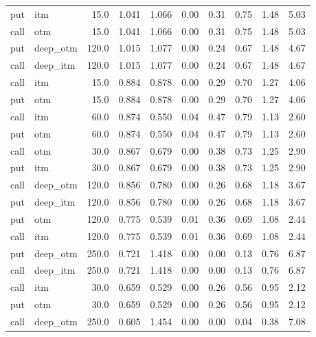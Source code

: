 \begin{longtable}{llrrrrrrrr}
  put &       itm &      15.0 & 1.041 & 1.066 &    0.00 &    0.31 &   0.75 &    1.48 &    5.03 \\
 call &       otm &      15.0 & 1.041 & 1.066 &    0.00 &    0.31 &   0.75 &    1.48 &    5.03 \\
  put &  deep\_otm &     120.0 & 1.015 & 1.077 &    0.00 &    0.24 &   0.67 &    1.48 &    4.67 \\
 call &  deep\_itm &     120.0 & 1.015 & 1.077 &    0.00 &    0.24 &   0.67 &    1.48 &    4.67 \\
 call &       itm &      15.0 & 0.884 & 0.878 &    0.00 &    0.29 &   0.70 &    1.27 &    4.06 \\
  put &       otm &      15.0 & 0.884 & 0.878 &    0.00 &    0.29 &   0.70 &    1.27 &    4.06 \\
 call &       itm &      60.0 & 0.874 & 0.550 &    0.04 &    0.47 &   0.79 &    1.13 &    2.60 \\
  put &       otm &      60.0 & 0.874 & 0.550 &    0.04 &    0.47 &   0.79 &    1.13 &    2.60 \\
 call &       otm &      30.0 & 0.867 & 0.679 &    0.00 &    0.38 &   0.73 &    1.25 &    2.90 \\
  put &       itm &      30.0 & 0.867 & 0.679 &    0.00 &    0.38 &   0.73 &    1.25 &    2.90 \\
 call &  deep\_otm &     120.0 & 0.856 & 0.780 &    0.00 &    0.26 &   0.68 &    1.18 &    3.67 \\
  put &  deep\_itm &     120.0 & 0.856 & 0.780 &    0.00 &    0.26 &   0.68 &    1.18 &    3.67 \\
  put &       otm &     120.0 & 0.775 & 0.539 &    0.01 &    0.36 &   0.69 &    1.08 &    2.44 \\
 call &       itm &     120.0 & 0.775 & 0.539 &    0.01 &    0.36 &   0.69 &    1.08 &    2.44 \\
  put &  deep\_otm &     250.0 & 0.721 & 1.418 &    0.00 &    0.00 &   0.13 &    0.76 &    6.87 \\
 call &  deep\_itm &     250.0 & 0.721 & 1.418 &    0.00 &    0.00 &   0.13 &    0.76 &    6.87 \\
 call &       itm &      30.0 & 0.659 & 0.529 &    0.00 &    0.26 &   0.56 &    0.95 &    2.12 \\
  put &       otm &      30.0 & 0.659 & 0.529 &    0.00 &    0.26 &   0.56 &    0.95 &    2.12 \\
 call &  deep\_otm &     250.0 & 0.605 & 1.454 &    0.00 &    0.00 &   0.04 &    0.38 &    7.08 \\

\end{longtable}
